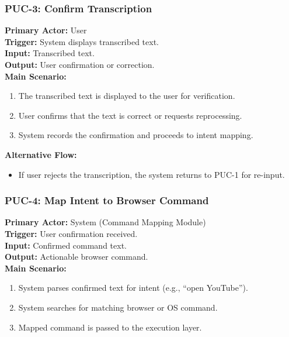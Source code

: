 \documentclass[11pt]{article}
\begin{document}
\bigskip

\subsubsection*{PUC-3: Confirm Transcription}
\textbf{Primary Actor:} User \\
\textbf{Trigger:} System displays transcribed text. \\
\textbf{Input:} Transcribed text. \\
\textbf{Output:} User confirmation or correction. \\

\textbf{Main Scenario:}
\begin{enumerate}
  \item The transcribed text is displayed to the user for verification.
  \item User confirms that the text is correct or requests reprocessing.
  \item System records the confirmation and proceeds to intent mapping.
\end{enumerate}

\textbf{Alternative Flow:}
\begin{itemize}
  \item If user rejects the transcription, the system returns to PUC-1 for re-input.
\end{itemize}

\bigskip

\subsubsection*{PUC-4: Map Intent to Browser Command}
\textbf{Primary Actor:} System (Command Mapping Module) \\
\textbf{Trigger:} User confirmation received. \\
\textbf{Input:} Confirmed command text. \\
\textbf{Output:} Actionable browser command. \\

\textbf{Main Scenario:}
\begin{enumerate}
  \item System parses confirmed text for intent (e.g., “open YouTube”).
  \item System searches for matching browser or OS command.
  \item Mapped command is passed to the execution layer.
\end{enumerate}
\end{document}
